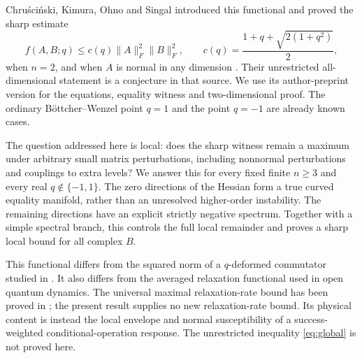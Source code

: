 \documentclass[11pt,a4paper]{article}
\newcommand{\norm}[1]{\lVert #1\rVert_F}
\begin{document}
Chru\'sci\'nski, Kimura, Ohno and Singal introduced this functional and
proved the sharp estimate
\begin{equation}
 f(A,B;q)\leq c(q)\norm{A}^2\norm{B}^2,\qquad
 c(q)=\frac{1+q+\sqrt{2(1+q^2)}}2,
 \label{eq:global}
\end{equation}
when \(n=2\), and when \(A\) is normal in any dimension
\citep[Theorem~1]{ckos2022response}. Their unrestricted all-dimensional
statement is a conjecture in that source. We use its author-preprint
version for the equations, equality witness and two-dimensional proof.
The ordinary B\"ottcher--Wenzel point \(q=1\) and the point \(q=-1\)
are already known cases.

The question addressed here is local: does the sharp witness remain
a maximum under arbitrary small matrix perturbations, including
nonnormal perturbations and couplings to extra levels?
We answer this for every fixed finite \(n\geq3\) and every real
\(q\notin\{-1,1\}\). The zero directions of the Hessian form a true
curved equality manifold, rather than an unresolved higher-order
instability. The remaining directions have an explicit strictly
negative spectrum. Together with a simple spectral branch, this
controls the full local remainder and proves a sharp local bound
for all complex \(B\).

This functional differs from the squared norm of a
\(q\)-deformed commutator studied in
\citep{ckos2022norm,nobori2026}. It also differs from the averaged
relaxation functional used in open quantum dynamics. The universal
maximal relaxation-rate bound has been proved in
\citep{muratore2024}; the present result supplies no new relaxation-rate
bound. Its physical content is instead the local envelope and normal
susceptibility of a success-weighted conditional-operation response.
The unrestricted inequality \eqref{eq:global} is not proved here.
\end{document}

